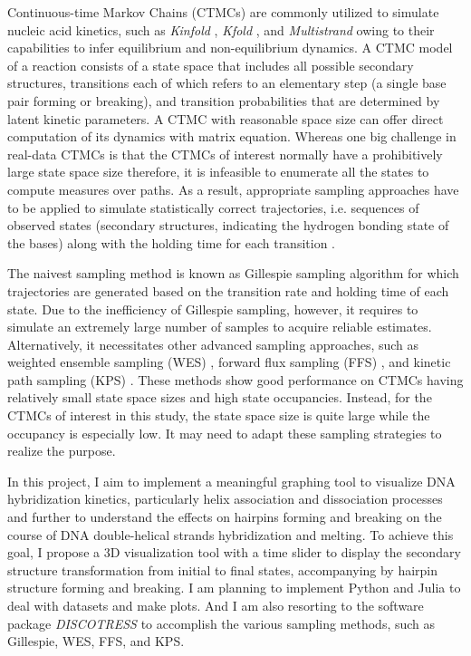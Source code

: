 \documentclass{article}
\begin{document}
Continuous-time Markov Chains (CTMCs) are commonly utilized to simulate nucleic acid kinetics, such as \textit{Kinfold} \cite{Kinfold}, \textit{Kfold} \cite{Kfold}, and \textit{Multistrand} \cite{Schaeffer} owing to their capabilities to infer equilibrium and non-equilibrium dynamics. A CTMC model of a reaction consists of a state space that includes all possible secondary structures, transitions each of which refers to an elementary step (a single base pair forming or breaking), and transition probabilities that are determined by latent kinetic parameters. A CTMC with reasonable space size can offer direct computation of its dynamics with matrix equation. Whereas one big challenge in real-data CTMCs is that the CTMCs of interest normally have a prohibitively large state space size therefore, it is infeasible to enumerate all the states to compute measures over paths. As a result, appropriate sampling approaches have to be applied to simulate statistically correct trajectories, i.e. sequences of observed states (secondary structures, indicating the hydrogen bonding state of the bases) along with the holding time for each transition \cite{Schaeffer}.

The naivest sampling method is known as Gillespie sampling algorithm \cite{Gillespie} for which trajectories are generated based on the transition rate and holding time of each state. Due to the inefficiency of Gillespie sampling, however, it requires to simulate an extremely large number of samples to acquire reliable estimates. Alternatively, it necessitates other advanced sampling approaches, such as weighted ensemble sampling (WES) \cite{WE_sample}, forward flux sampling (FFS) \cite{FFS1,FFS2}, and kinetic path sampling (KPS) \cite{KPS1,KPS2}. These methods show good performance on CTMCs having relatively small state space sizes and high state occupancies. Instead, for the CTMCs of interest in this study, the state space size is quite large while the occupancy is especially low. It may need to adapt these sampling strategies to realize the purpose.

In this project, I aim to implement a meaningful graphing tool to visualize DNA hybridization kinetics, particularly helix association and dissociation processes and further to understand the effects on hairpins forming and breaking on the course of DNA double-helical strands hybridization and melting. To achieve this goal, I propose a 3D visualization tool with a time slider to display the secondary structure transformation from initial to final states, accompanying by hairpin structure forming and breaking. I am planning to implement Python and Julia to deal with datasets and make plots. And I am also resorting to the software package \textit{DISCOTRESS} \cite{Discotress1,Discotress2} to accomplish the various sampling methods, such as Gillespie, WES, FFS, and KPS. 
\end{document}
